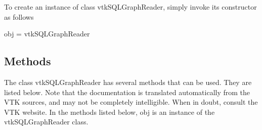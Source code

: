To create an instance of class vtk\-S\-Q\-L\-Graph\-Reader, simply invoke its constructor as follows \begin{DoxyVerb}  obj = vtkSQLGraphReader
\end{DoxyVerb}
 \hypertarget{vtkwidgets_vtkxyplotwidget_Methods}{}\subsection{Methods}\label{vtkwidgets_vtkxyplotwidget_Methods}
The class vtk\-S\-Q\-L\-Graph\-Reader has several methods that can be used. They are listed below. Note that the documentation is translated automatically from the V\-T\-K sources, and may not be completely intelligible. When in doubt, consult the V\-T\-K website. In the methods listed below, {\ttfamily obj} is an instance of the vtk\-S\-Q\-L\-Graph\-Reader class. 
